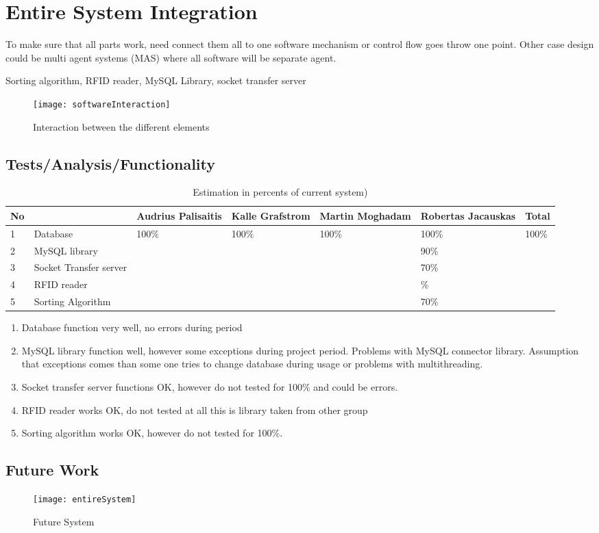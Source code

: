 %
\section{Entire System Integration}

To make sure that all parts work, need connect them all to one software mechanism or control flow goes throw one point. Other case design could be multi agent systems (MAS) where all software will be separate agent.

Sorting algorithm, RFID reader, MySQL Library, socket transfer server

\begin{figure}[h]
	\centering
		\texttt{[image: softwareInteraction]}
	\caption{Interaction between the different elements}
	\label{fig:planning}
\end{figure}


\subsection{Tests/Analysis/Functionality}

\begin{table}[h]
	
    \begin{tabular}{ | p{0.5cm} | p{3.5cm} | p{1.6cm} | p{1.6cm} |p{1.6cm} |p{1.6cm} |p{1cm} |}
    \hline
	No &  & Audrius Palisaitis & Kalle Grafstrom & Martin Moghadam & Robertas Jacauskas & Total\\ \hline
	1 & Database & 100\% & 100\% & 100\% & 100\% & 100\% \\ \hline
	2 & MySQL library &  &  &  & 90\% &  \\ \hline
	3 & Socket Transfer server &  &  &  & 70\% &  \\ \hline
	4 & RFID reader &  &  &  & \% &  \\ \hline
	5 & Sorting Algorithm &  &  &  & 70\% &  \\ \hline
    \end{tabular}
	\caption{Estimation in percents of current system)}
	\label{tab:percentSystem}
\end{table}

\begin{enumerate}
	\item Database function very well, no errors during period
	\item MySQL library function well, however some exceptions during project period. Problems with MySQL connector library. Assumption that exceptions comes than some one tries to change database during usage or problems with multithreading.
	\item Socket transfer server functions OK, however do not tested for 100\% and could be errors.
	\item RFID reader works OK, do not tested at all this is library taken from other group
	\item Sorting algorithm works OK, however do not tested for 100\%.
\end{enumerate}

\subsection{Future Work}

\begin{figure}[h]
	\centering
		\texttt{[image: entireSystem]}
	\caption{Future System}
	\label{fig:planning}
\end{figure}